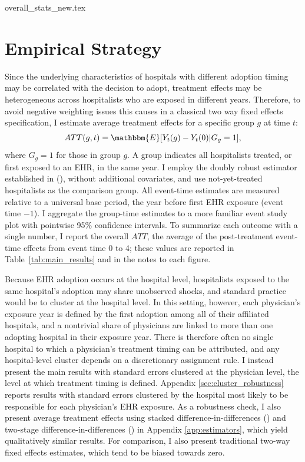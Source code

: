 \documentclass[12pt]{article}
\begin{document}
{overall_stats_new.tex}







\section{Empirical Strategy}\label{sec:empstrat}

Since the underlying characteristics of hospitals with different adoption timing may be correlated with the decision to adopt, treatment effects may be heterogeneous across hospitalists who are exposed in different years. Therefore, to avoid negative weighting issues this causes in a classical two way fixed effects specification, I estimate average treatment effects for a specific group $g$ at time $t$: 
$$ATT(g,t)=\mathbbm{E}[Y_t(g)-Y_t(0)|G_g=1],$$
where $G_g=1$ for those in group $g$. A group indicates all hospitalists treated, or first exposed to an EHR, in the same year. I employ the doubly robust estimator established in \citeauthor{sant2020doubly} (\citeyear{sant2020doubly}), without additional covariates, and use not-yet-treated hospitalists as the comparison group. All event-time estimates are measured relative to a universal base period, the year before first EHR exposure (event time $-1$). I aggregate the group-time estimates to a more familiar event study plot with pointwise 95\% confidence intervals. To summarize each outcome with a single number, I report the overall $ATT$, the average of the post-treatment event-time effects from event time 0 to 4; these values are reported in Table~\ref{tab:main_results} and in the notes to each figure.

Because EHR adoption occurs at the hospital level, hospitalists exposed to the same hospital's adoption may share unobserved shocks, and standard practice would be to cluster at the hospital level. In this setting, however, each physician's exposure year is defined by the first adoption among all of their affiliated hospitals, and a nontrivial share of physicians are linked to more than one adopting hospital in their exposure year. There is therefore often no single hospital to which a physician's treatment timing can be attributed, and any hospital-level cluster depends on a discretionary assignment rule. I instead present the main results with standard errors clustered at the physician level, the level at which treatment timing is defined. Appendix \ref{sec:cluster_robustness} reports results with standard errors clustered by the hospital most likely to be responsible for each physician's EHR exposure. As a robustness check, I also present average treatment effects using stacked difference-in-differences (\cite{cengiz2019effect}) and two-stage difference-in-differences (\cite{gardner2021two}) in Appendix \ref{app:estimators}, which yield qualitatively similar results. For comparison, I also present traditional two-way fixed effects estimates, which tend to be biased towards zero.
\end{document}
